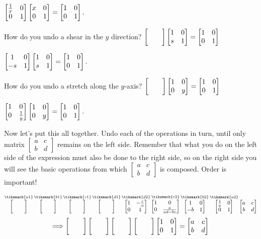 \documentclass[../gatm_answers.tex]{subfiles}
\begin{document}
\begin{iinner_problem}
\begin{iinner_problem}
\begin{iinner_problem}
$\begin{bmatrix} \frac{1}{x} & 0 \\ 0 & 1 \end{bmatrix}\begin{bmatrix} x & 0 \\ 0 & 1 \end{bmatrix}=\begin{bmatrix} 1 & 0 \\ 0 & 1 \end{bmatrix}.$

\begin{inner_problem}
\item How do you undo a shear in the $y$ direction?
$\blanktwomat\twomat{1}{0}{s}{1}=\twomat{1}{0}{0}{1}$
\end{inner_problem}

$\begin{bmatrix} 1 & 0 \\ -s & 1 \end{bmatrix}\begin{bmatrix} 1 & 0 \\ s & 1 \end{bmatrix}=\begin{bmatrix} 1 & 0 \\ 0 & 1 \end{bmatrix}.$

\begin{inner_problem}
\item How do you undo a stretch along the $y$-axis?
$\blanktwomat\twomat{1}{0}{0}{y}=\twomat{1}{0}{0}{1}$
\end{inner_problem}

$\begin{bmatrix} 1 & 0 \\ 0 & \frac{1}{y} \end{bmatrix}\begin{bmatrix} 1 & 0 \\ 0 & y \end{bmatrix}=\begin{bmatrix} 1 & 0 \\ 0 & 1 \end{bmatrix}.$

\begin{outer_problem}
\item Now let's put this all together. Undo each of the operations in turn, until only matrix $\left[\begin{smallmatrix}a & c \\ b & d \end{smallmatrix}\right]$ remains on the left side. Remember that what you do on the left side of the expression must also be done to the right side, so on the right side you will see the basic operations from which $\left[\begin{smallmatrix}a & c \\ b & d \end{smallmatrix}\right]$ is composed. Order is important!
\end{outer_problem}

\vspace{1.5cm}
$$\mathop{\blanktwomat}^{\tikzmark{a1}}
\mathop{\blanktwomat}^{\tikzmark{b1}}
\mathop{\blanktwomat}^{\tikzmark{c1}}
\mathop{\blanktwomat}^{\tikzmark{d1}}
\mathop{\twomat{1}{-\frac{c}{a}}{0}{1}}^{\tikzmark{d2}}
\mathop{\twomat{1}{0}{0}{\frac{a}{ad-bc}}}^{\tikzmark{c2}}
\mathop{\twomat{1}{0}{-b}{1}}^{\tikzmark{b2}}
\mathop{\twomat{\frac{1}{a}}{0}{0}{1}}^{\tikzmark{a2}}
\twomat{a}{c}{b}{d}$$
$$\Longrightarrow \blanktwomat\blanktwomat\blanktwomat\blanktwomat\twomat{1}{0}{0}{1} = \twomat{a}{c}{b}{d}$$



\end{iinner_problem}
\end{iinner_problem}
\end{iinner_problem}
\end{document}
